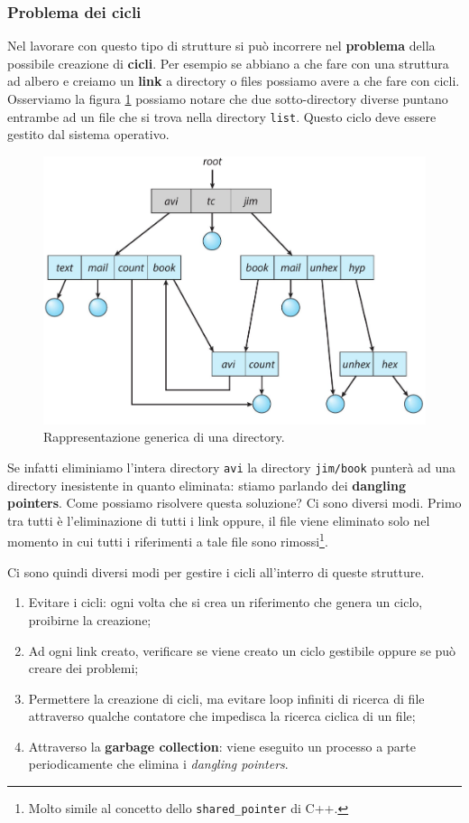 \subsubsection{Problema dei cicli}
Nel lavorare con questo tipo di strutture si può incorrere nel \textbf{problema} della possibile creazione di \textbf{cicli}. Per esempio se abbiano a che fare con una struttura ad albero e creiamo un \textbf{link} a directory o files possiamo avere a che fare con cicli. Osserviamo la figura \ref{fig:acyclic-graph dir} possiamo notare che due sotto-directory diverse puntano entrambe ad un file che si trova nella directory \texttt{list}. Questo ciclo deve essere gestito dal sistema operativo.
\begin{figure}[h]
    \centering
    \includegraphics[width = .5\textwidth]{../res/imgs/file system interface/general graph dir.png}
    \caption{Rappresentazione generica di una directory.}
    \label{fig:acyclic-graph dir}
\end{figure}
Se infatti eliminiamo l'intera directory \texttt{avi} la directory \texttt{jim/book} punterà ad una directory inesistente in quanto eliminata: stiamo parlando dei \textbf{dangling pointers}. Come possiamo risolvere questa soluzione? Ci sono diversi modi. Primo tra tutti è l'eliminazione di tutti i link oppure, il file viene eliminato solo nel momento in cui tutti i riferimenti a tale file sono rimossi\footnote{Molto simile al concetto dello \texttt{shared\_pointer} di C++.}.

Ci sono quindi diversi modi per gestire i cicli all'interro di queste strutture.
\vspace{-5px}
\begin{enumerate}
\setlength{\itemsep}{-.15 em}
    \item Evitare i cicli: ogni volta che si crea un riferimento che genera un ciclo, proibirne la creazione;
    \item Ad ogni link creato, verificare se viene creato un ciclo gestibile oppure se può creare dei problemi;
    \item Permettere la creazione di cicli, ma evitare loop infiniti di ricerca di file attraverso qualche contatore che impedisca la ricerca ciclica di un file;
    \item Attraverso la \textbf{garbage collection}: viene eseguito un processo a parte periodicamente che elimina i \textit{dangling pointers}.
\end{enumerate}

